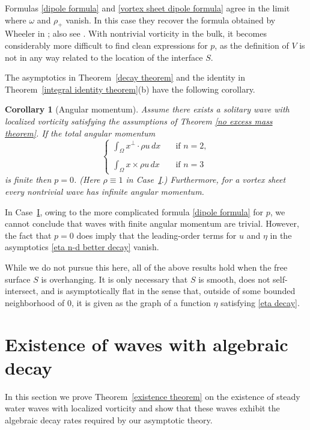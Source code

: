 \documentclass[11pt,reqno]{amsart}
\newcommand{\I}{\texorpdfstring{\hyperref[sec non-singular]{I}}{I}}
\theoremstyle{plain}
\newtheorem{corollary}[theorem]{Corollary}
\theoremstyle{remark}
\numberwithin{equation}{section}
\begin{document}
Formulas \eqref{dipole formula} and \eqref{vortex sheet dipole formula} agree in the limit where $\omega$ and $\rho_+$ vanish. In this case they recover the formula
obtained by Wheeler in \cite{wheeler2016integral}; also see \cite{longuet1989capillary}. With nontrivial vorticity in the bulk, it becomes considerably more difficult to find clean expressions for $p$, as the definition of $V$ is not in any way related to the location of the interface $S$.  

The asymptotics in Theorem~\ref{decay theorem} and the identity in Theorem~\ref{integral identity theorem}(b) have the following corollary.

\begin{corollary}[Angular momentum] \label{angular momentum corollary} 
  Assume there exists a solitary wave with localized vorticity satisfying the assumptions of Theorem \ref{no excess mass theorem}.  If the total angular momentum 
  \[
    \left\{
      \begin{array}{ll} 
        \displaystyle  \int_\Omega x^\perp \cdot \rho u \, dx \quad & \text{if } n = 2, \\ \\
        \displaystyle \int_\Omega x \times \rho u \, dx  & \text{if } n = 3
      \end{array}
    \right.
  \]
  is finite then $p=0$. (Here $\rho \equiv 1$ in Case~\I.) Furthermore, for a vortex sheet every nontrivial wave has infinite angular momentum.
\end{corollary}

In Case~\I, owing to the more complicated formula \eqref{dipole formula} for $p$, we cannot conclude that waves with finite angular momentum are trivial. However, the fact that $p=0$ does imply that the leading-order terms for $u$ and $\eta$ in the asymptotics \eqref{eta n-d better decay} vanish.


While we do not pursue this here, all of the above results hold when the free surface $S$ is overhanging.  It is only necessary that $S$ is smooth, does not self-intersect, and is asymptotically flat in the sense that, outside of some bounded neighborhood of $0$, it is given as the graph of a function $\eta$ satisfying \eqref{eta decay}.  



\section{Existence of waves with algebraic decay} \label{existence section}
In this section we prove Theorem~\ref{existence theorem} on the existence of steady water waves with localized vorticity and show that these waves exhibit the algebraic decay rates required by our asymptotic theory.   
\end{document}
